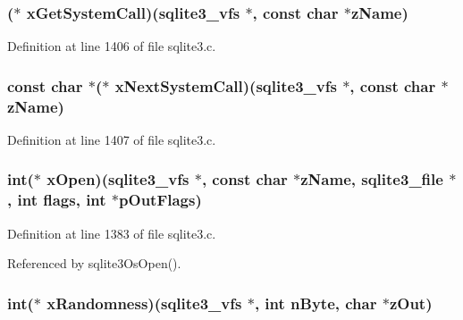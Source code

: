 \subsubsection[{x\+Get\+System\+Call}]{($\ast$ x\+Get\+System\+Call)({\bf sqlite3\+\_\+vfs} $\ast$, const char $\ast${\bf z\+Name})}\label{structsqlite3__vfs_a1a9847423eacc3a0b3f529bc6cef940e}


Definition at line 1406 of file sqlite3.\+c.

\hypertarget{structsqlite3__vfs_a6a0903c490980a85988acccc7c038a86}{}
\subsubsection[{x\+Next\+System\+Call}]{\setlength{\rightskip}{0pt plus 5cm}const char $\ast$($\ast$ x\+Next\+System\+Call)({\bf sqlite3\+\_\+vfs} $\ast$, const char $\ast${\bf z\+Name})}\label{structsqlite3__vfs_a6a0903c490980a85988acccc7c038a86}


Definition at line 1407 of file sqlite3.\+c.

\hypertarget{structsqlite3__vfs_a6cc44918b6646d3b005b0b04c01e3fe5}{}
\subsubsection[{x\+Open}]{\setlength{\rightskip}{0pt plus 5cm}int($\ast$ x\+Open)({\bf sqlite3\+\_\+vfs} $\ast$, const char $\ast${\bf z\+Name}, {\bf sqlite3\+\_\+file} $\ast$, int flags, int $\ast$p\+Out\+Flags)}\label{structsqlite3__vfs_a6cc44918b6646d3b005b0b04c01e3fe5}


Definition at line 1383 of file sqlite3.\+c.



Referenced by sqlite3\+Os\+Open().

\hypertarget{structsqlite3__vfs_ab2a1ae7c84e12eafb727d8def03d28a0}{}
\subsubsection[{x\+Randomness}]{\setlength{\rightskip}{0pt plus 5cm}int($\ast$ x\+Randomness)({\bf sqlite3\+\_\+vfs} $\ast$, int n\+Byte, char $\ast$z\+Out)}\label{structsqlite3__vfs_ab2a1ae7c84e12eafb727d8def03d28a0}


